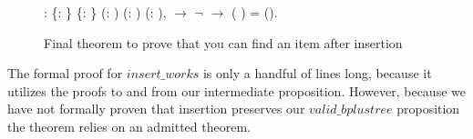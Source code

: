 \begin{figure}
  \begin{coqdoccode}
  \coqdocnoindent
   : \coqdockw{\ensuremath{\forall}} \{: \} \{: \} (: ) (: ) (:   ),\coqdoceol
  \coqdocindent{1.00em}
      \ensuremath{\rightarrow}\coqdoceol
  \coqdocindent{1.00em}
  \ensuremath{\lnot}    \ensuremath{\rightarrow}\coqdoceol
  \coqdocindent{1.00em}
    (   ) =  ().\coqdoceol
  \end{coqdoccode}
  \caption{Final theorem to prove that you can find an item after insertion}
  \label{fig:insert_works}
\end{figure}

The formal proof for $insert\_works$ is only a handful of lines long, because it utilizes the proofs to and from our intermediate proposition. However, because we have not formally proven that insertion preserves our $valid\_bplustree$ proposition the theorem relies on an admitted theorem.
